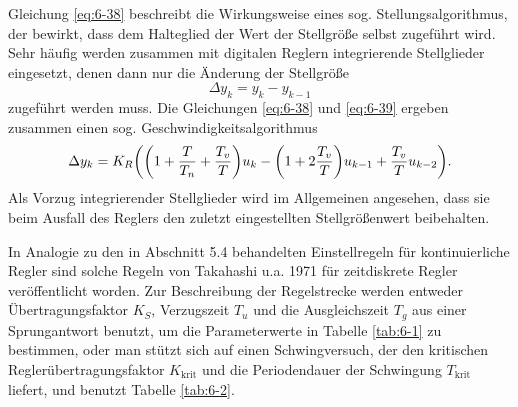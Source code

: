 Gleichung \eqref{eq:6-38} beschreibt die Wirkungsweise eines sog. Stellungsalgorithmus, der bewirkt, dass dem Halteglied der Wert der Stellgröße selbst zugeführt wird.
Sehr häufig werden zusammen mit digitalen Reglern integrierende Stellglieder eingesetzt, denen dann nur die Änderung der Stellgröße
\begin{equation}\label{eq:6-39}
	\Delta y_k = y_k - y_{k - 1}
\end{equation}
zugeführt werden muss.
Die Gleichungen \eqref{eq:6-38} und \eqref{eq:6-39} ergeben zusammen einen sog. Geschwindigkeitsalgorithmus
\begin{equation}\label{eq:6-40}
	\Delta y_k = K_R \parentheses*{\parentheses*{1 + \frac{T}{T_n} + \frac{T_v}{T}}u_k - \parentheses*{1 + 2\frac{T_v}{T}}u_{k - 1} + \frac{T_v}{T}u_{k - 2}}.
\end{equation}
Als Vorzug integrierender Stellglieder wird im Allgemeinen angesehen, dass sie beim Ausfall des Reglers den zuletzt eingestellten Stellgrößenwert beibehalten.

In Analogie zu den in Abschnitt 5.4 behandelten Einstellregeln für kontinuierliche Regler sind solche Regeln von Takahashi u.a. 1971 für zeitdiskrete Regler veröffentlicht worden.
Zur Beschreibung der Regelstrecke werden entweder Übertragungsfaktor \(K_S\), Verzugszeit \(T_u\) und die Ausgleichszeit \(T_g\) aus einer Sprungantwort benutzt, um die Parameterwerte in Tabelle \ref{tab:6-1} zu bestimmen, oder man stützt sich auf einen Schwingversuch, der den kritischen Reglerübertragungsfaktor \(K_{\text{krit}}\) und die Periodendauer der Schwingung \(T_{\text{krit}}\) liefert, und benutzt Tabelle \ref{tab:6-2}.

